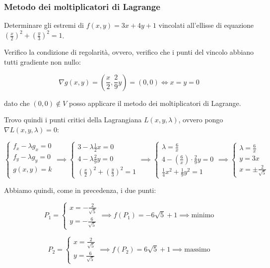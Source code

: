 \filbreak{}
\subsubsection*{Metodo dei moltiplicatori di Lagrange}

Determinare gli estremi di \(f(x,y) = 3x + 4y +1\) vincolati all'ellisse di equazione \({\left(\frac{x}{2}\right)}^{2}+ {\left(\frac{y}{3}\right)}^{2}=1\).

Verifico la condizione di regolarità, ovvero, verifico che i punti del vincolo abbiano tutti gradiente non nullo:

\[
    \nabla g(x,y) = \left( \frac{x}{2}, \frac{2}{9}y \right) = (0,0) \iff x=y = 0
\]

dato che \((0,0) \notin V\) posso applicare il metodo dei moltiplicatori di Lagrange.

Trovo quindi i punti critici della Lagrangiana \(L(x,y,\lambda)\), ovvero pongo \(\nabla L(x,y,\lambda) = 0\):

\[
    \begin{cases*}
        f_x - \lambda g_x = 0 \\
        f_y - \lambda g_y = 0 \\
        g(x,y) = k            \\
    \end{cases*}
    \implies
    \begin{cases*}
        3- \lambda \frac{1}{2}x = 0   \\
        4 - \lambda \frac{2}{9} y = 0 \\
        {(\frac{x}{2})}^{2}+{(\frac{y}{3})}^{2}=1
    \end{cases*}
    \implies
    \begin{cases*}
        \lambda = \frac{6}{x}                               \\
        4 - \left( \frac{6}{x} \right)\cdot\frac{2}{9}y = 0 \\
        \frac{1}{4}x^2 + \frac{1}{9}y^2 = 1
    \end{cases*}
    \implies
    \begin{cases*}
        \lambda = \frac{6}{x} \\
        y = 3x                \\
        x = \pm \frac{2}{\sqrt{5}}
    \end{cases*}
\]

Abbiamo quindi, come in precedenza, i due punti:

\[
    P_1=\begin{cases}
        x= - \frac{2}{\sqrt{5}} \\
        y = -\frac{6}{\sqrt{5}}
    \end{cases}
    \implies
    f(P_1) = -6 \sqrt{5} + 1
    \implies
    \text{minimo}
\]

\[
    P_2=\begin{cases}
        x = \frac{2}{\sqrt{5}} \\
        y = \frac{6}{\sqrt{5}}
    \end{cases}
    \implies
    f(P_2) = 6 \sqrt{5} + 1
    \implies
    \text{massimo}
\]
